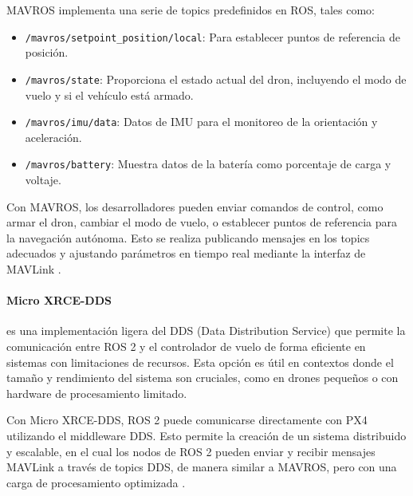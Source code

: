             MAVROS implementa una serie de topics predefinidos en ROS, tales como:
            \begin{itemize}
                \item \texttt{/mavros/setpoint\_position/local}: Para establecer puntos de referencia de posición.
                \item \texttt{/mavros/state}: Proporciona el estado actual del dron, incluyendo el modo de vuelo y si el vehículo está armado.
                \item \texttt{/mavros/imu/data}: Datos de IMU para el monitoreo de la orientación y aceleración.
                \item \texttt{/mavros/battery}: Muestra datos de la batería como porcentaje de carga y voltaje.
            \end{itemize}
            
            Con MAVROS, los desarrolladores pueden enviar comandos de control, como armar el dron, cambiar el modo de vuelo, o establecer puntos de referencia para la navegación autónoma. Esto se realiza publicando mensajes en los topics adecuados y ajustando parámetros en tiempo real mediante la interfaz de MAVLink \cite{px4_ros2}.
            
            \begin{figure}
                \centering
                \label{fig:mavros}
            \end{figure}

            \paragraph{Micro XRCE-DDS}
            es una implementación ligera del DDS (Data Distribution Service) que permite la comunicación entre ROS 2 y el controlador de vuelo de forma eficiente en sistemas con limitaciones de recursos. Esta opción es útil en contextos donde el tamaño y rendimiento del sistema son cruciales, como en drones pequeños o con hardware de procesamiento limitado.
    
            Con Micro XRCE-DDS, ROS 2 puede comunicarse directamente con PX4 utilizando el middleware DDS. Esto permite la creación de un sistema distribuido y escalable, en el cual los nodos de ROS 2 pueden enviar y recibir mensajes MAVLink a través de topics DDS, de manera similar a MAVROS, pero con una carga de procesamiento optimizada \cite{px4_ros2}.
    
